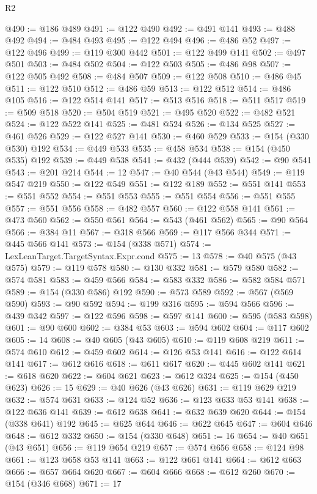 \begin{lexlean}{R2}
\begin{coremodule}
@490 := @186 @489
@491 := @122 @490
@492 := @491 @141
@493 := @488 @492
@494 := @484 @493
@495 := @122 @494
@496 := @486 @52
@497 := @122 @496
@499 := @119 @300 @442
@501 := @122 @499 @141
@502 := @497 @501
@503 := @484 @502
@504 := @122 @503
@505 := @486 @98
@507 := @122 @505 @492
@508 := @484 @507
@509 := @122 @508
@510 := @486 @45
@511 := @122 @510
@512 := @486 @59
@513 := @122 @512
@514 := @486 @105
@516 := @122 @514 @141
@517 := @513 @516
@518 := @511 @517
@519 := @509 @518
@520 := @504 @519
@521 := @495 @520
@522 := @482 @521
@524 := @122 @522 @141
@525 := @481 @524
@526 := @134 @525
@527 := @461 @526
@529 := @122 @527 @141
@530 := @460 @529
@533 := @154 (@330 @530) @192
@534 := @449 @533
@535 := @458 @534
@538 := @154 (@450 @535) @192
@539 := @449 @538
@541 := @432 (@444 @539)
@542 := @90 @541
@543 := @201 @214
@544 := 12
@547 := @40 @544 (@43 @544)
@549 := @119 @547 @219
@550 := @122 @549
@551 := @122 @189
@552 := @551 @141
@553 := @551 @552
@554 := @551 @553
@555 := @551 @554
@556 := @551 @555
@557 := @551 @556
@558 := @482 @557
@560 := @122 @558 @141
@561 := @473 @560
@562 := @550 @561
@564 := @543 (@461 @562)
@565 := @90 @564
@566 := @384 @11
@567 := @318 @566
@569 := @117 @566 @344
@571 := @445 @566 @141
@573 := @154 (@338 @571)
@574 := LexLeanTarget.TargetSyntax.Expr.cond
@575 := 13
@578 := @40 @575 (@43 @575)
@579 := @119 @578
@580 := @130 @332
@581 := @579 @580
@582 := @574 @581
@583 := @459 @566
@584 := @583 @332
@586 := @582 @584 @571
@589 := @154 (@330 @586) @192
@590 := @573 @589
@592 := @567 (@569 @590)
@593 := @90 @592
@594 := @199 @316
@595 := @594 @566
@596 := @439 @342
@597 := @122 @596
@598 := @597 @141
@600 := @595 (@583 @598)
@601 := @90 @600
@602 := @384 @53
@603 := @594 @602
@604 := @117 @602
@605 := 14
@608 := @40 @605 (@43 @605)
@610 := @119 @608 @219
@611 := @574 @610
@612 := @459 @602
@614 := @126 @53 @141
@616 := @122 @614 @141
@617 := @612 @616
@618 := @611 @617
@620 := @445 @602 @141
@621 := @618 @620
@622 := @604 @621
@623 := @612 @324
@625 := @154 (@450 @623)
@626 := 15
@629 := @40 @626 (@43 @626)
@631 := @119 @629 @219
@632 := @574 @631
@633 := @124 @52
@636 := @123 @633 @53 @141
@638 := @122 @636 @141
@639 := @612 @638
@641 := @632 @639 @620
@644 := @154 (@338 @641) @192
@645 := @625 @644
@646 := @622 @645
@647 := @604 @646
@648 := @612 @332
@650 := @154 (@330 @648)
@651 := 16
@654 := @40 @651 (@43 @651)
@656 := @119 @654 @219
@657 := @574 @656
@658 := @124 @98
@661 := @123 @658 @53 @141
@663 := @122 @661 @141
@664 := @612 @663
@666 := @657 @664 @620
@667 := @604 @666
@668 := @612 @260
@670 := @154 (@346 @668)
@671 := 17

\end{coremodule}
\end{lexlean}
